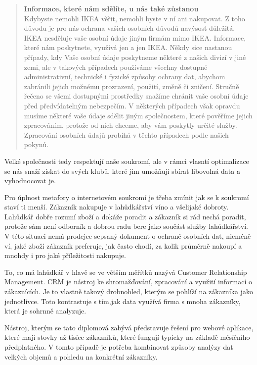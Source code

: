 \documentclass[bc,female,java,dept456]{diploma}						%
\begin{document}
\begin{quote}
{\bf Informace, které nám sdělíte, u nás také zůstanou}\\
Kdybyste nemohli IKEA věřit, nemohli byste v ní ani nakupovat. Z toho důvodu je pro nás ochrana vašich osobních důvodů navýsost důležitá. IKEA nesděluje vaše osobní údaje jiným firmám mimo IKEA. Informace, které nám poskytnete, využívá jen a jen IKEA. Někdy sice nastanou případy, kdy Vaše osobní údaje poskytneme některé z našich divizí v jiné zemi, ale v takových případech používáme všechny dostupné administrativní, technické i fyzické způsoby ochrany dat, abychom zabránili jejich možnému prozrazení, použití, změně či zničení. Stručně řečeno se všemi dostupnými prostředky snažíme chránit vaše osobní údaje před předvídatelným nebezpečím. V některých případech však opravdu musíme některé vaše údaje sdělit jiným společnostem, které pověříme jejich zpracováním, protože od nich chceme, aby vám poskytly určité služby. Zpracování osobních údajů probíhá v těchto případech podle našich pokynů. 
\end{quote}

Velké společnosti tedy respektují naše soukromí, ale v rámci vlasntí optimalizace se nás snaží získat do svých klubů, které jim umožňují sbírat libovolná data a vyhodnocovat je.

Pro úplnost metafory o internetovém soukromí je třeba zmínit jak se k soukromí staví ti menší. Zákazník nakupuje v lahůdkářství víno a všelijaké dobroty. Lahůdkář dobře rozumí zboží a dokáže poradit a zákazník si rád nechá poradit,  protože sám není odborník a dobrou radu bere jako součást služby lahůdkářství. V této situaci nemá prodejce sepsaný dokument o ochraně osobních dat, nicméně ví, jaké zboží zákazník preferuje, jak často chodí, za kolik průměrně nakoupí a mnohdy i pro jaké příležitosti nakupuje.

To, co má lahůdkář v hlavě se ve větším měřítků nazývá Customer Relationship Management. CRM je nástroj ke shromažďování, zpracování a využití informací o zákaznících. Je to vlastně takový drobnohled, kterým se pohlíží na zákazníka jako jednotlivce. Toto kontrastuje s tím,jak data využívá firma s mnoha zákazníky, která je sohrnně analyzuje.

\bigskip

Nástroj, kterým se tato diplomová zabývá představuje řešení pro webové aplikace, které mají stovky až tisíce zákazníků, které fungují typicky na základě měsíčního předplatného. V tomto případě je potřeba kombinovat způsoby analýzy dat velkých objemů a pohledu na konkrétní zákazníky. 
\end{document}
